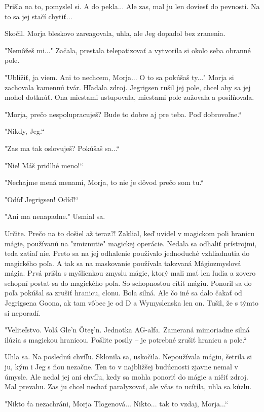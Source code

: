 \documentclass{book}
\begin{document}
Prišla na to, pomyslel si. A do pekla... Ale zas, mal ju len doviesť do pevnosti. Na to sa jej stačí chytiť...

Skočil. Morja bleskovo zareagovala, uhla, ale Jeg dopadol bez zranenia.

"$ $Nemôžeš mi..."$ $ Začala, prestala telepatizovať a vytvorila si okolo seba obranné pole.

"$ $Ublížiť, ja viem. Ani to nechcem, Morja... O to sa pokúšaš ty..."$ $ Morja si zachovala kamennú tvár. Hľadala zdroj. Jegrigsen rušil jej pole, chcel aby sa jej mohol dotknúť. Ona miestami ustupovala, miestami pole zužovala a posilňovala.

"$ $Morja, prečo nespolupracuješ? Bude to dobre aj pre teba. Poď dobrovoľne.“

"$ $Nikdy, Jeg.“

"$ $Zas ma tak oslovuješ? Pokúšaš sa...“

"$ $Nie! Máš pridlhé meno!“

"$ $Nechajme mená menami, Morja, to nie je dôvod prečo som tu.“

"$ $Odíď Jegrigsen! Odíď!“

"$ $Ani ma nenapadne."$ $ Usmial sa.

Určite. Prečo na to došiel až teraz?! Zaklial, keď uvidel v magickom poli hranicu mágie, používanú na "$ $zmiznutie"$ $ magickej operácie. Nedala sa odhaliť prístrojmi, teda zatiaľ nie. Preto sa na jej odhalenie používalo jednoduché vzhliadnutia do magického poľa. A tak sa na maskovanie používala takzvaná Mágiozmyslová mágia. Prvá prišla s myšlienkou zmyslu mágie, ktorý mali mať len ľudia a zovero schopní postať sa do magického poľa. So schopnosťou cítiť mágiu. Ponoril sa do poľa pokúšal sa zrušiť hranicu, clonu. Bola silná. Ale čo iné sa dalo čakať od Jegrigsena Goona, ak tam vôbec je od D a Wymyslenska len on. Tušil, že s týmto si neporadí.

"$ $Veliteľstvo. Volá Gle'n O\v{}te\c{e}'n. Jednotka AG-alfa. Zameraná mimoriadne silná ilúzia s magickou hranicou. Pošlite posily – je potrebné zrušiť hranicu a pole.“

Uhla sa. Na poslednú chvíľu. Sklonila sa, uskočila. Nepoužívala mágiu, šetrila si ju, kým i Jeg s ňou nezačne. Ten to v najbližšej budúcnosti zjavne nemal v úmysle. Ale nedal jej ani chvíľu, kedy sa mohla ponoriť do mágie a ničiť zdroj. Mal prevahu. Zas ju chcel nechať paralyzovať, ale včas to ucítila, uhla sa kúzlu.

"$ $Nikto ťa nezachráni, Morja Tlogenová... Nikto... tak to vzdaj, Morja...“
\end{document}
